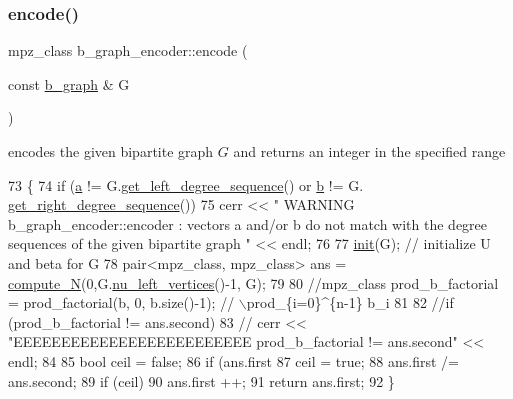 \mbox{\label{classb__graph__encoder_a9dbf40f42a2eb12822b14ca10d580763}} 
\subsubsection{\texorpdfstring{encode()}{encode()}}
{\footnotesize\ttfamily mpz\+\_\+class b\+\_\+graph\+\_\+encoder\+::encode (\begin{DoxyParamCaption}\item[{const \hyperlink{classb__graph}{b\+\_\+graph} \&}]{G }\end{DoxyParamCaption})}



encodes the given bipartite graph $G$ and returns an integer in the specified range 


\begin{DoxyCode}
73 \{
74   \textcolor{keywordflow}{if} (\hyperlink{classb__graph__encoder_afd22d167f495cd85b41397f337c377c2}{a} != G.\hyperlink{classb__graph_afd65fb655f7e24217393a10533b87d3c}{get\_left\_degree\_sequence}() or \hyperlink{classb__graph__encoder_a767826e268702e45ab71565e096a52b8}{b} != G.
      \hyperlink{classb__graph_a2711566385b92b02f4c03abdc1f9a582}{get\_right\_degree\_sequence}())
75     cerr << \textcolor{stringliteral}{" WARNING b\_graph\_encoder::encoder : vectors a and/or b do not match with the degree sequences
       of the given bipartite graph  "} << endl;
76 
77   \hyperlink{classb__graph__encoder_a9b62ac0580191ac42b98d764046af7cb}{init}(G); \textcolor{comment}{// initialize U and beta for G}
78   pair<mpz\_class, mpz\_class> ans = \hyperlink{classb__graph__encoder_a3ffcfb945e8563d01e683fc5e5127d6d}{compute\_N}(0,G.\hyperlink{classb__graph_a5e71d5c97f2501b0b93c17146cf7e68e}{nu\_left\_vertices}()-1, G);
79 
80   \textcolor{comment}{//mpz\_class prod\_b\_factorial = prod\_factorial(b, 0, b.size()-1); // \(\backslash\)prod\_\{i=0\}^\{n-1\} b\_i}
81 
82   \textcolor{comment}{//if (prod\_b\_factorial != ans.second)}
83   \textcolor{comment}{//  cerr << "EEEEEEEEEEEEEEEEEEEEEEEEE prod\_b\_factorial != ans.second" << endl;}
84 
85   \textcolor{keywordtype}{bool} ceil = \textcolor{keyword}{false};
86   \textcolor{keywordflow}{if} (ans.first %
87     ceil = \textcolor{keyword}{true};
88   ans.first /= ans.second;
89   \textcolor{keywordflow}{if} (ceil)
90     ans.first ++;
91   \textcolor{keywordflow}{return} ans.first;
92 \}
\end{DoxyCode}
\mbox{\label{classb__graph__encoder_a9b62ac0580191ac42b98d764046af7cb}} 
